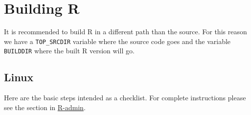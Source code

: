 \documentclass[
]{book}
\begin{document}
\section{Building R}\label{building-r}

It is recommended to build R in a different path than the source.
For this reason we have a \texttt{TOP\_SRCDIR} variable where the source code goes and the variable \texttt{BUILDDIR} where the built R version will go.

\subsection{Linux}\label{linux}

Here are the basic steps intended as a checklist.
For complete instructions please see the section in \href{https://cran.r-project.org/doc/manuals/r-devel/R-admin.html\#Installing-R-under-Unix_002dalikes}{R-admin}.
\end{document}
